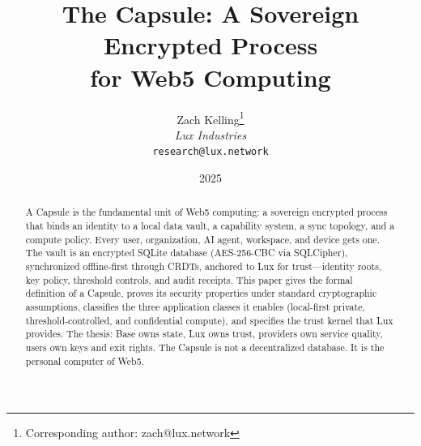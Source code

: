\documentclass[11pt,a4paper]{article}
\title{\textbf{The Capsule: A Sovereign Encrypted Process\\for Web5 Computing}}
\author{
Zach Kelling\thanks{Corresponding author: zach@lux.network}\\
\textit{Lux Industries}\\
\texttt{research@lux.network}
}
\date{2025}
\begin{document}
\luxcoverpage

\begin{abstract}
A Capsule is the fundamental unit of Web5 computing: a sovereign encrypted process
that binds an identity to a local data vault, a capability system, a sync topology,
and a compute policy. Every user, organization, AI agent, workspace, and device
gets one. The vault is an encrypted SQLite database (AES-256-CBC via SQLCipher),
synchronized offline-first through CRDTs, anchored to Lux for trust---identity
roots, key policy, threshold controls, and audit receipts. This paper gives the
formal definition of a Capsule, proves its security properties under standard
cryptographic assumptions, classifies the three application classes it enables
(local-first private, threshold-controlled, and confidential compute), and
specifies the trust kernel that Lux provides. The thesis: Base owns state, Lux
owns trust, providers own service quality, users own keys and exit rights. The
Capsule is not a decentralized database. It is the personal computer of Web5.
\end{abstract}














\end{document}
